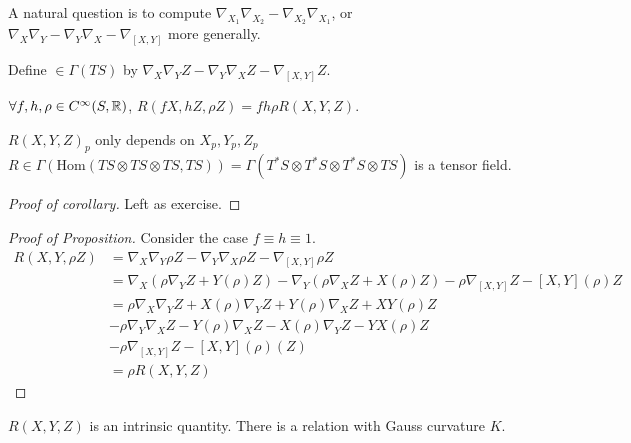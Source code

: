 A natural question is to compute  $ \nabla_{X_1}\nabla_{X_2}-\nabla_{X_2}\nabla_{X_1} $, or  $ \nabla_{X}\nabla_{Y}-\nabla_{Y}\nabla_{X}-\nabla_{[X,Y]} $ more generally.

Define  $ \in\Gamma(TS) $ by  $ \nabla_{X}\nabla_YZ-\nabla_{Y}\nabla_XZ-\nabla_{[X,Y]}Z$.

\begin{proposition}
     $ \forall f,h,\rho\in C^\infty(S,\mathbb R) $,  $ R(fX,hZ,\rho Z)=fh\rho R(X,Y,Z) $.  
\end{proposition}
\begin{corollary}
     $ R(X,Y,Z)_p $ only depends on  $ X_p,Y_p,Z_p $ \ie  $ R\in \Gamma(\mathrm{Hom}(TS\otimes TS\otimes TS,TS))=\Gamma(T^*S\otimes T^*S\otimes T^*S\otimes TS) $ is a tensor field. 
\end{corollary}
\begin{proof}[Proof of corollary]
    Left as exercise.
\end{proof}
\begin{proof}[Proof of Proposition]
    Consider the case  $ f\equiv h\equiv 1 $.
    \begin{align*}
        R(X,Y,\rho Z)&=\nabla_X\nabla_Y\rho Z-\nabla_Y\nabla_X\rho Z-\nabla_{[X,Y]}\rho Z\\
        &=\nabla_X(\rho\nabla_YZ+Y(\rho)Z)-\nabla_Y(\rho\nabla_XZ+X(\rho)Z)-\rho\nabla_{[X,Y]}Z-[X,Y](\rho)Z\\
        &=\rho\nabla_X\nabla_YZ+X(\rho)\nabla_YZ+Y(\rho)\nabla_XZ+XY(\rho)Z\\
        &-\rho\nabla_Y\nabla_XZ-Y(\rho)\nabla_XZ-X(\rho)\nabla_YZ-YX(\rho)Z\\
        &-\rho\nabla_{[X,Y]}Z-[X,Y](\rho)(Z)\\
        &=\rho R(X,Y,Z)
    \end{align*} 
\end{proof}

$ R(X,Y,Z) $ is an intrinsic  quantity. There is a relation with Gauss curvature  $ K $.

